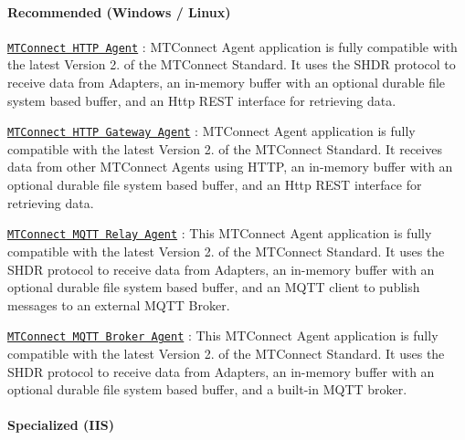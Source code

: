 \paragraph*{Recommended (Windows / Linux)}


\begin{DoxyItemize}
\item \href{https://github.com/TrakHound/MTConnect.NET/tree/master/applications/Agents/MTConnect-Agent-Http}{\tt M\+T\+Connect H\+T\+TP Agent} \+: M\+T\+Connect Agent application is fully compatible with the latest Version 2. of the M\+T\+Connect Standard. It uses the S\+H\+DR protocol to receive data from Adapters, an in-\/memory buffer with an optional durable file system based buffer, and an Http R\+E\+ST interface for retrieving data.
\item \href{https://github.com/TrakHound/MTConnect.NET/tree/master/applications/Agents/MTConnect-Agent-Http-Gateway}{\tt M\+T\+Connect H\+T\+TP Gateway Agent} \+: M\+T\+Connect Agent application is fully compatible with the latest Version 2. of the M\+T\+Connect Standard. It receives data from other M\+T\+Connect Agents using H\+T\+TP, an in-\/memory buffer with an optional durable file system based buffer, and an Http R\+E\+ST interface for retrieving data.
\item \href{https://github.com/TrakHound/MTConnect.NET/tree/master/applications/Agents/MTConnect-Agent-MQTT-Relay}{\tt M\+T\+Connect M\+Q\+TT Relay Agent} \+: This M\+T\+Connect Agent application is fully compatible with the latest Version 2. of the M\+T\+Connect Standard. It uses the S\+H\+DR protocol to receive data from Adapters, an in-\/memory buffer with an optional durable file system based buffer, and an M\+Q\+TT client to publish messages to an external M\+Q\+TT Broker.
\item \href{https://github.com/TrakHound/MTConnect.NET/tree/master/applications/Agents/MTConnect-Agent-MQTT-Broker}{\tt M\+T\+Connect M\+Q\+TT Broker Agent} \+: This M\+T\+Connect Agent application is fully compatible with the latest Version 2. of the M\+T\+Connect Standard. It uses the S\+H\+DR protocol to receive data from Adapters, an in-\/memory buffer with an optional durable file system based buffer, and a built-\/in M\+Q\+TT broker.
\end{DoxyItemize}

\paragraph*{Specialized (I\+IS)}


